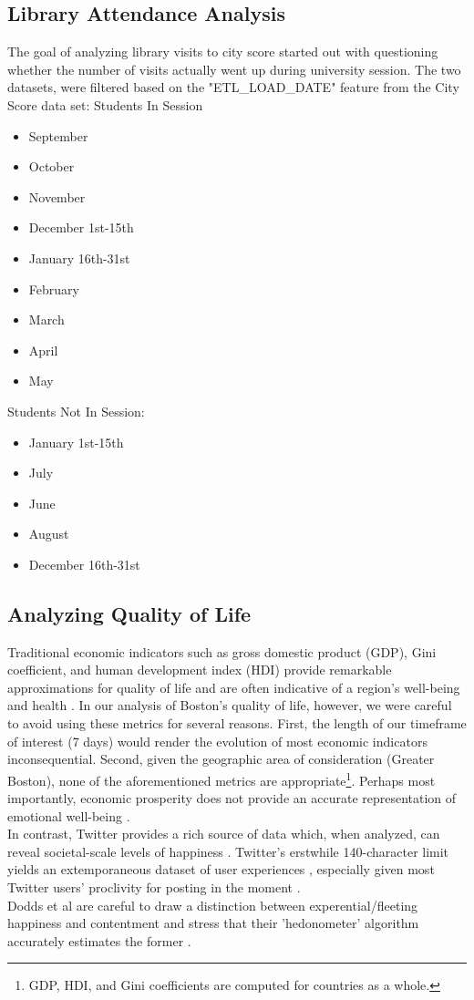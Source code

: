 \documentclass[journal, a4paper]{IEEEtran}
\begin{document}
\subsection{Library Attendance Analysis}
The goal of analyzing library visits to city score started out with questioning whether the number of visits actually went up during university session. The two datasets, were filtered based on the "ETL\_LOAD\_DATE" feature from the City Score data set:
\newline Students In Session
\begin{itemize}
    \item September
    \item October 
    \item November
    \item December 1st-15th
    \item January 16th-31st
    \item February
    \item March
    \item April
    \item May
\end{itemize}
Students Not In Session: 
\begin{itemize}
    \item January 1st-15th
    \item July
    \item June
    \item August
    \item December 16th-31st
\end{itemize}
\subsection{Analyzing Quality of Life}
Traditional economic indicators such as gross domestic product (GDP), Gini coefficient, and human development index (HDI) provide remarkable approximations for quality of life and are often indicative of a region's well-being and health \cite{gallup}\cite{wellbgallup}. In our analysis of Boston's quality of life, however, we were careful to avoid using these metrics for several reasons. First, the length of our timeframe of interest (7 days) would render the evolution of most economic indicators inconsequential. Second, given the geographic area of consideration (Greater Boston), none of the aforementioned metrics are appropriate\footnote{GDP, HDI, and Gini coefficients are computed for countries as a whole.}. Perhaps most importantly, economic prosperity does not provide an accurate representation of emotional well-being \cite{wellbgallup}. 
\\In contrast, Twitter provides a rich source of data which, when analyzed, can reveal societal-scale levels of happiness \cite{happytexttwitter}. Twitter's erstwhile 140-character limit yields an extemporaneous dataset of user experiences \cite{moralsc}, especially given most Twitter users' proclivity for posting in the moment \cite{twtrends}\cite{mtwtrends}.
\\Dodds et al are careful to draw a distinction between experential/fleeting happiness and contentment and stress that their 'hedonometer' algorithm accurately estimates the former \cite{happytext}.
\end{document}

